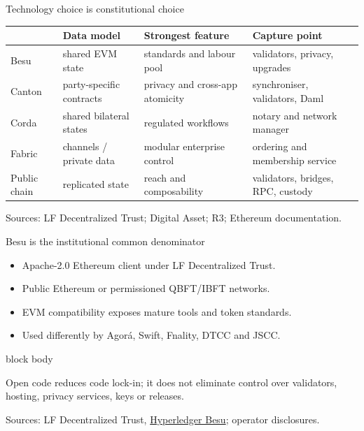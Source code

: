 \documentclass[aspectratio=169,12pt]{beamer}
\newcommand{\source}[1]{\vfill\par\fontsize{5.4}{6.5}\selectfont\color{Quiet}Sources: #1}
\newcommand{\tightitems}{\setlength{\itemsep}{0.42em}\setlength{\parskip}{0pt}}
\newenvironment{statement}{%
  \begin{beamercolorbox}[sep=.18cm,rounded=false,wd=\linewidth]{block body}%
  \fontsize{13}{15.5}\selectfont\bfseries
}{\end{beamercolorbox}}
\begin{document}
\begin{frame}{Technology choice is constitutional choice}
  \fontsize{9.1}{10.9}\selectfont
  \begin{tabularx}{\textwidth}{L{1.5cm}Y Y Y}
    \toprule
    & \textbf{Data model} & \textbf{Strongest feature} & \textbf{Capture point} \\
    \midrule
    Besu & shared EVM state & standards and labour pool & validators, privacy, upgrades \\
    Canton & party-specific contracts & privacy and cross-app atomicity & synchroniser, validators, Daml \\
    Corda & shared bilateral states & regulated workflows & notary and network manager \\
    Fabric & channels / private data & modular enterprise control & ordering and membership service \\
    Public chain & replicated state & reach and composability & validators, bridges, RPC, custody \\
    \bottomrule
  \end{tabularx}
  \source{LF Decentralized Trust; Digital Asset; R3; Ethereum documentation.}
\end{frame}

\begin{frame}{Besu is the institutional common denominator}
  \begin{itemize}\tightitems
    \item Apache-2.0 Ethereum client under LF Decentralized Trust.
    \item Public Ethereum or permissioned QBFT/IBFT networks.
    \item EVM compatibility exposes mature tools and token standards.
    \item Used differently by Agor\'a, Swift, Fnality, DTCC and JSCC.
  \end{itemize}
  \begin{statement}
    Open code reduces code lock-in; it does not eliminate control over validators, hosting, privacy services, keys or releases.
  \end{statement}
  \source{LF Decentralized Trust, \href{https://www.lfdecentralizedtrust.org/projects/besu}{Hyperledger Besu}; operator disclosures.}
\end{frame}
\end{document}
